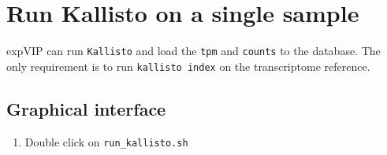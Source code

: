 \section{Run Kallisto on a single
sample}\label{run-kallisto-on-a-single-sample}

expVIP can run \lstinline!Kallisto! and load the \lstinline!tpm! and
\lstinline!counts! to the database. The only requirement is to run
\lstinline!kallisto index! on the transcriptome reference.

\subsection{Graphical interface}\label{graphical-interface}

\begin{enumerate}
\def\labelenumi{\arabic{enumi}.}
\itemsep1pt\parskip0pt
\item
  Double click on \lstinline!run_kallisto.sh!

\end{enumerate}
